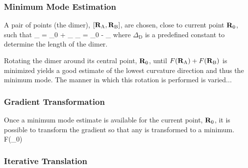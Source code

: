 \subsubsection{Minimum Mode Estimation}
A pair of points (the dimer), $[{\mathrm{\mathbf{\bm{R}}}}_\text{A}, {\mathrm{\mathbf{\bm{R}}}}_\text{B}]$, are chosen, close to current point ${\mathrm{\mathbf{\bm{R}}}}_0$, such that
\vR_ = \vR_0 + \Delta_\uvn \quad {} \quad \vR_ = \vR_0  - \Delta_\uvn
\eeq
where $\Delta_\text{D}$ is a predefined constant to determine the length of the dimer.

Rotating the dimer around its central point, ${\mathrm{\mathbf{\bm{R}}}}_0$, until $F({\mathrm{\mathbf{\bm{R}}}}_\text{A}) + F({\mathrm{\mathbf{\bm{R}}}}_\text{B})$ is minimized yields a good estimate of the lowest curvature direction and thus the minimum mode. \cite{voter-hyperdynamics-1997}
The manner in which this rotation is performed is varied...

\incomplete

\subsubsection{Gradient Transformation}
Once a minimum mode estimate is available for the current point, ${\mathrm{\mathbf{\bm{R}}}}_0$, it is possible to transform the gradient so that any  is transformed to a minimum.
\nabla{}F(\vR_0)
\eeq


\incomplete

\subsubsection{Iterative Translation}

\incomplete
